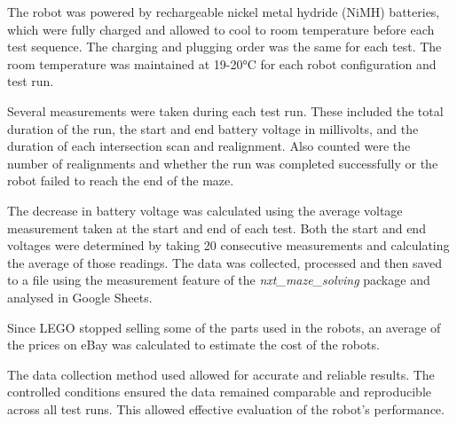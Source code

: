 The robot was powered by rechargeable nickel metal hydride (NiMH) batteries, which were fully charged and allowed to cool to room temperature before each test sequence. The charging and plugging order was the same for each test. The room temperature was maintained at 19-20°C for each robot configuration and test run.

Several measurements were taken during each test run. These included the total duration of the run, the start and end battery voltage in millivolts, and the duration of each intersection scan and realignment. Also counted were the number of realignments and whether the run was completed successfully or the robot failed to reach the end of the maze.

The decrease in battery voltage was calculated using the average voltage measurement taken at the start and end of each test. Both the start and end voltages were determined by taking 20 consecutive measurements and calculating the average of those readings. The data was collected, processed and then saved to a file using the measurement feature of the \textit{nxt\_maze\_solving} package and analysed in Google Sheets.

Since LEGO stopped selling some of the parts used in the robots, an average of the prices on eBay was calculated to estimate the cost of the robots.

The data collection method used allowed for accurate and reliable results. The controlled conditions ensured the data remained comparable and reproducible across all test runs. This allowed effective evaluation of the robot's performance.